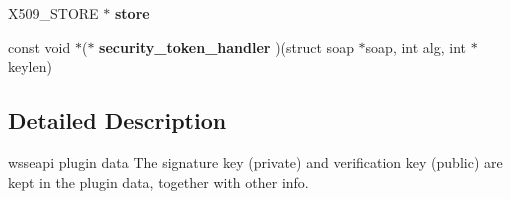 \begin{DoxyCompactItemize}
\item 
\hypertarget{structsoap__wsse__data_ad9dafc222188ed3aba83c24b073a0021}{
X509\_\-STORE $\ast$ {\bfseries store}}
\label{structsoap__wsse__data_ad9dafc222188ed3aba83c24b073a0021}

\item 
\hypertarget{structsoap__wsse__data_a851779cad909e0f0185eb316b6f918ea}{
const void $\ast$($\ast$ {\bfseries security\_\-token\_\-handler} )(struct soap $\ast$soap, int alg, int $\ast$keylen)}
\label{structsoap__wsse__data_a851779cad909e0f0185eb316b6f918ea}

\end{DoxyCompactItemize}


\subsection{Detailed Description}
wsseapi plugin data The signature key (private) and verification key (public) are kept in the plugin data, together with other info. 

